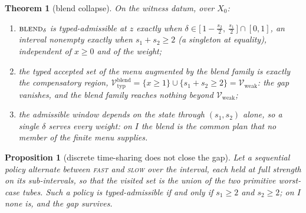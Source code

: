 \documentclass[preprint,11pt,authoryear]{elsarticle}
\newtheorem{theorem}{Theorem}
\newtheorem{proposition}{Proposition}
\theoremstyle{definition}
\theoremstyle{remark}
\newcommand{\Vtyp}{\mathcal{V}_{\mathrm{typ}}}
\newcommand{\Vweak}{\mathcal{V}_{\mathrm{weak}}}
\newcommand{\act}[1]{\textsc{#1}}
\begin{document}
\begin{theorem}[blend collapse]\label{thm:blend}
On the witness datum, over $X_0$:
\begin{enumerate}[label=\textup{(\roman*)},leftmargin=2em]
\item $\act{blend}_\delta$ is typed-admissible at $z$ exactly when $\delta\in\big[\,1-\tfrac{s_2}2,\ \tfrac{s_1}2\,\big]\cap[0,1]$, an interval nonempty exactly when $s_1+s_2\ge2$ (a singleton at equality), independent of $x\ge0$ and of the weight;
\item the typed accepted set of the menu augmented by the blend family is exactly the compensatory region,
$\Vtyp^{\mathrm{blend}}=\{x\ge1\}\cup\{s_1+s_2\ge2\}=\Vweak$: the gap vanishes, and the blend family reaches nothing beyond $\Vweak$;
\item the admissible window depends on the state through $(s_1,s_2)$ alone, so a single $\delta$ serves every weight: on $I$ the blend is the common plan that no member of the finite menu supplies.
\end{enumerate}
\end{theorem}

\begin{proposition}[discrete time-sharing does not close the gap]\label{prop:timeshare}
Let a sequential policy alternate between \act{fast} and \act{slow} over the interval, each held at full strength on its sub-intervals, so that the visited set is the union of the two primitive worst-case tubes. Such a policy is typed-admissible if and only if $s_1\ge2$ and $s_2\ge2$; on $I$ none is, and the gap survives.
\end{proposition}
\end{document}

